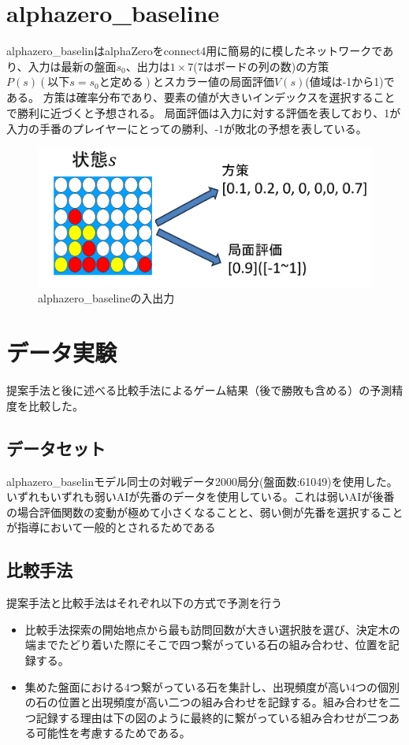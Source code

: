 \section{alphazero\_baseline\cite{baseline}}
alphazero\_baselinはalphaZeroをconnect4用に簡易的に模したネットワークであり、入力は最新の盤面$s_0$、出力は$1\times7$(7はボードの列の数)の方策$P(s)(以下s=s_0と定める)$とスカラー値の局面評価$V(s)$(値域は-1から1)である。
方策は確率分布であり、要素の値が大きいインデックスを選択することで勝利に近づくと予想される。
局面評価は入力に対する評価を表しており、1が入力の手番のプレイヤーにとっての勝利、-1が敗北の予想を表している。
\begin{figure}[t]
	\centering
	\includegraphics[width=\linewidth]{./figure/baseline.png}
	\caption{alphazero\_baselineの入出力}
	\label{fig:baseline}
\end{figure}

\section{データ実験}
\label{chap:evaluation}
提案手法と後に述べる比較手法によるゲーム結果（後で勝敗も含める）の予測精度を比較した。
\subsection{データセット}
alphazero\_baselinモデル同士の対戦データ2000局分(盤面数:61049)を使用した。いずれもいずれも弱いAIが先番のデータを使用している。これは弱いAIが後番の場合評価関数の変動が極めて小さくなることと、弱い側が先番を選択することが指導において一般的とされるためである

\subsection{比較手法}
提案手法と比較手法はそれぞれ以下の方式で予測を行う
\begin{itemize}
	\item 比較手法探索の開始地点から最も訪問回数が大きい選択肢を選び、決定木の端までたどり着いた際にそこで四つ繋がっている石の組み合わせ、位置を記録する。
	\item 集めた盤面における4つ繋がっている石を集計し、出現頻度が高い4つの個別の石の位置と出現頻度が高い二つの組み合わせを記録する。組み合わせを二つ記録する理由は下の図のように最終的に繋がっている組み合わせが二つある可能性を考慮するためである。
\end{itemize}

